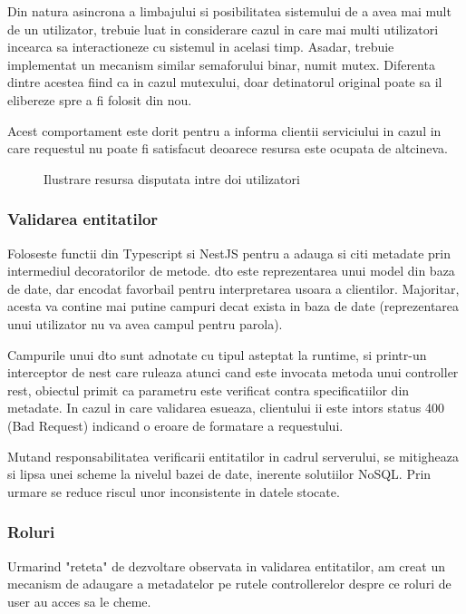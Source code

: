 Din natura asincrona a limbajului si posibilitatea sistemului de a avea mai mult de un utilizator, trebuie luat in considerare cazul in care mai multi utilizatori incearca sa interactioneze cu sistemul in acelasi timp. Asadar, trebuie implementat un mecanism similar semaforului binar, numit mutex. Diferenta dintre acestea fiind ca in cazul mutexului, doar detinatorul original poate sa il elibereze spre a fi folosit din nou.

Acest comportament este dorit pentru a informa clientii serviciului in cazul in care requestul nu poate fi satisfacut deoarece resursa este ocupata de altcineva.

\begin{figure}[H]
  \centering
  \caption{Ilustrare resursa disputata intre doi utilizatori}
\end{figure}


\subsubsection {Validarea entitatilor}

Foloseste functii din Typescript si NestJS pentru a adauga si citi metadate prin intermediul decoratorilor de metode. \acrfull{dto} este reprezentarea unui model din baza de date, dar encodat favorbail pentru interpretarea usoara a clientilor. Majoritar, acesta va contine mai putine campuri decat exista in baza de date (reprezentarea unui utilizator nu va avea campul pentru parola).

Campurile unui \acrfull{dto} sunt adnotate cu tipul asteptat la runtime, si printr-un interceptor de nest care ruleaza atunci cand este invocata metoda unui controller \acrshort{rest}, obiectul primit ca parametru este verificat contra specificatiilor din metadate. In cazul in care validarea esueaza, clientului ii este intors status 400 (Bad Request) indicand o eroare de formatare a requestului.

Mutand responsabilitatea verificarii entitatilor in cadrul serverului, se mitigheaza si lipsa unei scheme la nivelul bazei de date, inerente solutiilor NoSQL. Prin urmare se reduce riscul unor inconsistente in datele stocate.

\subsubsection {Roluri}

Urmarind "reteta" de dezvoltare observata in validarea entitatilor, am creat un mecanism de adaugare a metadatelor pe rutele controllerelor despre ce roluri de user au acces sa le cheme.

